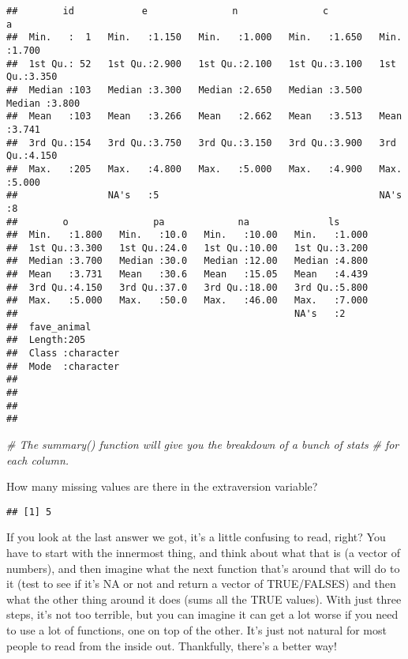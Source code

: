 \documentclass[
]{article}
\newenvironment{Shaded}{\begin{snugshade}}{\end{snugshade}}
\newcommand{\CommentTok}[1]{\textcolor[rgb]{0.56,0.35,0.01}{\textit{#1}}}
\newcommand{\FunctionTok}[1]{\textcolor[rgb]{0.13,0.29,0.53}{\textbf{#1}}}
\newcommand{\NormalTok}[1]{#1}
\newcommand{\SpecialCharTok}[1]{\textcolor[rgb]{0.81,0.36,0.00}{\textbf{#1}}}
\begin{document}
\begin{verbatim}
##        id            e               n               c               a        
##  Min.   :  1   Min.   :1.150   Min.   :1.000   Min.   :1.650   Min.   :1.700  
##  1st Qu.: 52   1st Qu.:2.900   1st Qu.:2.100   1st Qu.:3.100   1st Qu.:3.350  
##  Median :103   Median :3.300   Median :2.650   Median :3.500   Median :3.800  
##  Mean   :103   Mean   :3.266   Mean   :2.662   Mean   :3.513   Mean   :3.741  
##  3rd Qu.:154   3rd Qu.:3.750   3rd Qu.:3.150   3rd Qu.:3.900   3rd Qu.:4.150  
##  Max.   :205   Max.   :4.800   Max.   :5.000   Max.   :4.900   Max.   :5.000  
##                NA's   :5                                       NA's   :8      
##        o               pa             na              ls       
##  Min.   :1.800   Min.   :10.0   Min.   :10.00   Min.   :1.000  
##  1st Qu.:3.300   1st Qu.:24.0   1st Qu.:10.00   1st Qu.:3.200  
##  Median :3.700   Median :30.0   Median :12.00   Median :4.800  
##  Mean   :3.731   Mean   :30.6   Mean   :15.05   Mean   :4.439  
##  3rd Qu.:4.150   3rd Qu.:37.0   3rd Qu.:18.00   3rd Qu.:5.800  
##  Max.   :5.000   Max.   :50.0   Max.   :46.00   Max.   :7.000  
##                                                 NA's   :2      
##  fave_animal       
##  Length:205        
##  Class :character  
##  Mode  :character  
##                    
##                    
##                    
## 
\end{verbatim}

\begin{Shaded}
\begin{Highlighting}[]
\CommentTok{\# The summary() function will give you the breakdown of a bunch of stats}
\CommentTok{\# for each column.}
\end{Highlighting}
\end{Shaded}

How many missing values are there in the extraversion variable?

\begin{Shaded}
\end{Shaded}

\begin{verbatim}
## [1] 5
\end{verbatim}

If you look at the last answer we got, it's a little confusing to read,
right? You have to start with the innermost thing, and think about what
that is (a vector of numbers), and then imagine what the next function
that's around that will do to it (test to see if it's NA or not and
return a vector of TRUE/FALSES) and then what the other thing around it
does (sums all the TRUE values). With just three steps, it's not too
terrible, but you can imagine it can get a lot worse if you need to use
a lot of functions, one on top of the other. It's just not natural for
most people to read from the inside out. Thankfully, there's a better
way!
\end{document}
